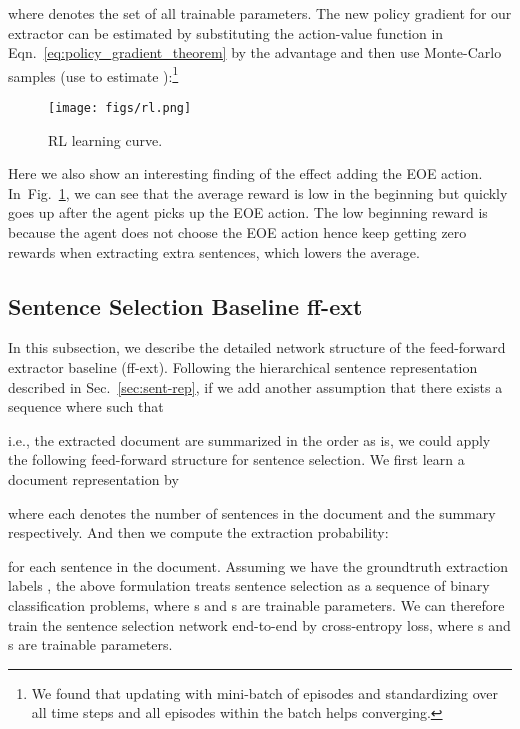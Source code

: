 \documentclass[11pt,a4paper]{article}
\def\figref#1{Fig.~\ref{#1}}
\def\secref#1{Sec.~\ref{#1}}
\def\eqnref#1{Eqn.~\ref{#1}}
\begin{document}
where 
denotes the set of all trainable parameters.
The new policy gradient for our extractor can be estimated by substituting the action-value function in \eqnref{eq:policy_gradient_theorem} by the advantage and then use Monte-Carlo samples (use  to estimate ):\footnote{We found that updating with mini-batch of episodes and standardizing 
 over all time steps and all episodes within the batch helps converging.
}


\begin{figure}
\texttt{[image: figs/rl.png]}
\vspace{-20pt}
\caption{RL learning curve.}
\label{fig:rl_curve}
\vspace{-10pt}
\end{figure}

Here we also show an interesting finding of the effect adding the EOE action.
In~\figref{fig:rl_curve}, we can see that the average reward is low in the beginning but quickly goes up after the agent picks up the EOE action.
The low beginning reward is because the agent does not choose the EOE action hence keep getting zero rewards when extracting extra sentences, which lowers the average.

\subsection{Sentence Selection Baseline ff-ext}
\label{sec:ff-ext}
In this subsection, we describe the detailed network structure of the feed-forward extractor baseline (ff-ext).
Following the hierarchical sentence representation described in \secref{sec:sent-rep}, 
if we add another assumption that there exists a sequence
 where
 such that 

i.e., the extracted document are summarized in the order as is,
we could apply the following feed-forward structure for sentence selection.
We first learn a document representation by

where  each denotes the number of sentences in the document  and the summary  respectively. 
And then we compute the extraction probability:

for each sentence in the document.
Assuming we have the groundtruth extraction labels 
, 
the above formulation treats sentence selection as a sequence of 
binary classification problems, where s and s are trainable parameters. 
We can therefore train the sentence selection network end-to-end by cross-entropy loss, where s and s are trainable parameters. 
\end{document}
